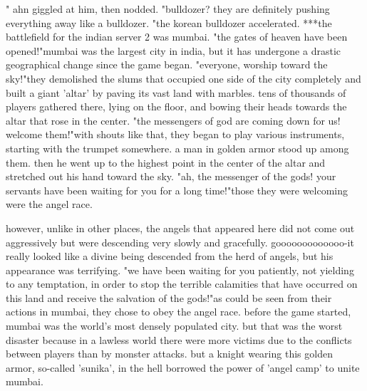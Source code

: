 "
ahn giggled at him, then nodded.
"bulldozer? they are definitely pushing everything away like a bulldozer.
"the korean bulldozer accelerated.
***the battlefield for the indian server 2 was mumbai.
"the gates of heaven have been opened!"mumbai was the largest city in india, but it has undergone a drastic geographical change since the game began.
"everyone, worship toward the sky!"they demolished the slums that occupied one side of the city completely and built a giant 'altar' by paving its vast land with marbles.
 tens of thousands of players gathered there, lying on the floor, and bowing their heads towards the altar that rose in the center.
"the messengers of god are coming down for us! welcome them!"with shouts like that, they began to play various instruments, starting with the trumpet somewhere.
a man in golden armor stood up among them.
 then he went up to the highest point in the center of the altar and stretched out his hand toward the sky.
"ah, the messenger of the gods! your servants have been waiting for you for a long time!"those they were welcoming were the angel race.
 

however, unlike in other places, the angels that appeared here did not come out aggressively but were descending very slowly and gracefully.
gooooooooooooo-it really looked like a divine being descended from the herd of angels, but his appearance was terrifying.
"we have been waiting for you patiently, not yielding to any temptation, in order to stop the terrible calamities that have occurred on this land and receive the salvation of the gods!"as could be seen from their actions in mumbai, they chose to obey the angel race.
before the game started, mumbai was the world's most densely populated city.
but that was the worst disaster because in a lawless world there were more victims due to the conflicts between players than by monster attacks.
but a knight wearing this golden armor, so-called 'sunika', in the hell borrowed the power of 'angel camp' to unite mumbai.


 